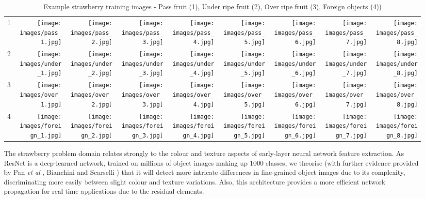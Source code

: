 \documentclass[fleqn,twoside]{article}
\begin{document}
\begin{table}[t]
	\centering
	\caption{Example strawberry training images - Pass fruit (1), Under ripe fruit (2), Over ripe fruit (3), Foreign objects (4))}
	\label{tab:training_samples}
	\begin{tabularx}{\textheight}{c*8{N}}
		
		1 &
		\texttt{[image: images/pass\_1.jpg]} & \texttt{[image: images/pass\_2.jpg]} & \texttt{[image: images/pass\_3.jpg]} &         \texttt{[image: images/pass\_4.jpg]} & \texttt{[image: images/pass\_5.jpg]} &         \texttt{[image: images/pass\_6.jpg]} & \texttt{[image: images/pass\_7.jpg]} &         \texttt{[image: images/pass\_8.jpg]} \\
		
		2 &
		\texttt{[image: images/under\_1.jpg]} & \texttt{[image: images/under\_2.jpg]} & \texttt{[image: images/under\_3.jpg]} &         \texttt{[image: images/under\_4.jpg]} & \texttt{[image: images/under\_5.jpg]} &         \texttt{[image: images/under\_6.jpg]} & \texttt{[image: images/under\_7.jpg]} &         \texttt{[image: images/under\_8.jpg]} \\
		
		3 &
		\texttt{[image: images/over\_1.jpg]} & \texttt{[image: images/over\_2.jpg]} & \texttt{[image: images/over\_3.jpg]} &         \texttt{[image: images/over\_4.jpg]} & \texttt{[image: images/over\_5.jpg]} &         \texttt{[image: images/over\_6.jpg]} & \texttt{[image: images/over\_7.jpg]} &         \texttt{[image: images/over\_8.jpg]} \\
		
		4 &
		\texttt{[image: images/foreign\_1.jpg]} & \texttt{[image: images/foreign\_2.jpg]} & \texttt{[image: images/foreign\_3.jpg]} &         \texttt{[image: images/foreign\_4.jpg]} & \texttt{[image: images/foreign\_5.jpg]} &         \texttt{[image: images/foreign\_6.jpg]} & \texttt{[image: images/foreign\_7.jpg]} &         \texttt{[image: images/foreign\_8.jpg]} \\
		
	\end{tabularx}
\end{table} 




The strawberry problem domain relates strongly to the colour and texture aspects of early-layer neural network feature extraction. As ResNet is a deep-learned network, trained on millions of object images making up $1000$ classes, we theorise (with further evidence provided by Pan {\it et al} \cite{pan}, Bianchini and Scarselli \cite{bianchini}) that it will detect more intricate differences in fine-grained object images due to its complexity, discriminating more easily between slight colour and texture variations. Also, this architecture provides a more efficient network propagation for real-time applications due to the residual elements.
\end{document}

